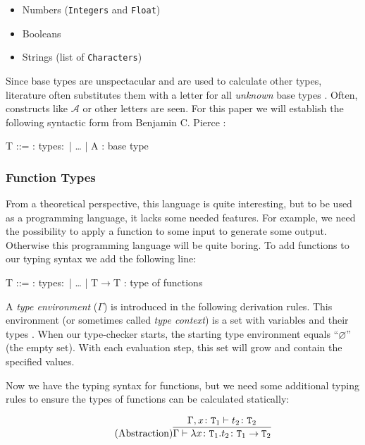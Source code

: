 \begin{itemize}
    \item Numbers (\texttt{Integers} and \texttt{Float})
    \item Booleans
    \item Strings (list of \texttt{Characters})
\end{itemize}

Since base types are unspectacular and are used to calculate other
types, literature often substitutes them with a letter for all
\textit{unknown} base types \cite{pierce2002ProgLang}. Often,
constructs like $\mathcal{A}$ or other letters are seen. For this
paper we will establish the following syntactic form
from Benjamin C. Pierce \cite{pierce2002ProgLang}:

\begin{bnfgrammar}
    T ::= : types$\colon$
    | \dots
    | A : base type
\end{bnfgrammar}

\subsubsection{Function Types}

From a theoretical perspective, this language is quite interesting, but to be used
as a programming language, it lacks some needed features. For example, we need the
possibility to apply a function to some input to generate some output. Otherwise
this programming language will be quite boring. To add functions to our typing
syntax we add the following line:

\begin{bnfgrammar}
    T ::= : types$\colon$
    | \dots
    | T$\rightarrow$T : type of functions
\end{bnfgrammar}

A \textit{type environment} ($\Gamma$) is introduced in the following derivation rules.
This environment (or sometimes called \textit{type context}) is
a set with variables and their types \cite{pierce2002ProgLang}.
When our type-checker starts, the starting type environment equals
``$\varnothing$'' (the empty set). With each evaluation step, this set will grow
and contain the specified values.

Now we have the typing syntax for functions, but we need some additional typing
rules to ensure the types of functions can be calculated statically:

\begin{equation*}
    \tag{Abstraction}
    \infer{
        \Gamma \vdash \lambda x \colon \texttt{T}_1 . t_2 \colon \texttt{T}_1 \rightarrow \texttt{T}_2
    }{
        \Gamma,x \colon \texttt{T}_1 \vdash t_2 \colon \texttt{T}_2
    }
\end{equation*}

